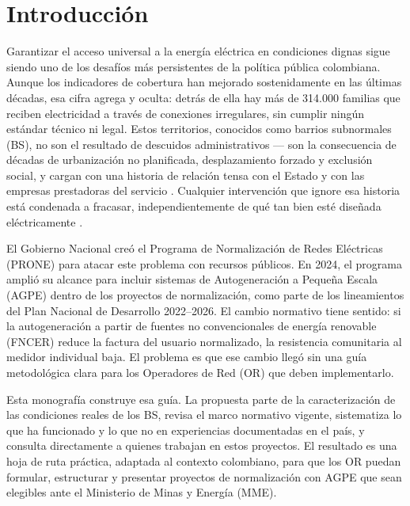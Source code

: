 
\chapter{Introducción}
\label{chap:introduccion}

Garantizar el acceso universal a la energía eléctrica en condiciones dignas sigue siendo uno de los desafíos más persistentes de la política pública colombiana. Aunque los indicadores de cobertura han mejorado sostenidamente en las últimas décadas, esa cifra agrega y oculta: detrás de ella hay más de 314.000 familias que reciben electricidad a través de conexiones irregulares, sin cumplir ningún estándar técnico ni legal. Estos territorios, conocidos como barrios subnormales (BS), no son el resultado de descuidos administrativos — son la consecuencia de décadas de urbanización no planificada, desplazamiento forzado y exclusión social, y cargan con una historia de relación tensa con el Estado y con las empresas prestadoras del servicio \parencite{SSPD2020}. Cualquier intervención que ignore esa historia está condenada a fracasar, independientemente de qué tan bien esté diseñada eléctricamente \parencite{SerranoRueda2019, VillagranRomero2022}.

El Gobierno Nacional creó el Programa de Normalización de Redes Eléctricas (PRONE) para atacar este problema con recursos públicos. En 2024, el programa amplió su alcance para incluir sistemas de Autogeneración a Pequeña Escala (AGPE) dentro de los proyectos de normalización, como parte de los lineamientos del Plan Nacional de Desarrollo 2022--2026. El cambio normativo tiene sentido: si la autogeneración a partir de fuentes no convencionales de energía renovable (FNCER) reduce la factura del usuario normalizado, la resistencia comunitaria al medidor individual baja. El problema es que ese cambio llegó sin una guía metodológica clara para los Operadores de Red (OR) que deben implementarlo.

Esta monografía construye esa guía. La propuesta parte de la caracterización de las condiciones reales de los BS, revisa el marco normativo vigente, sistematiza lo que ha funcionado y lo que no en experiencias documentadas en el país, y consulta directamente a quienes trabajan en estos proyectos. El resultado es una hoja de ruta práctica, adaptada al contexto colombiano, para que los OR puedan formular, estructurar y presentar proyectos de normalización con AGPE que sean elegibles ante el Ministerio de Minas y Energía (MME).


